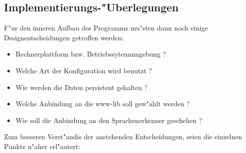 \subsection{Implementierungs-"Uberlegungen}
F"ur den inneren Aufbau des Programms mu"sten dann noch einige Designentscheidungen getroffen werden:
\begin{itemize}
	\item	Rechnerplattform bzw. Betriebssytemumgebung ?
	\item	Welche Art der Konfiguration wird benutzt ?
	\item	Wie werden die Daten persistent gehalten ?
	\item	Welche Anbindung an die www-lib soll gew"ahlt werden ?
	\item	Wie soll die Anbindung an den Sprachenerkenner geschehen ?
\end{itemize}

Zum besseren Verst"andis der anstehenden Entscheidungen, seien die einzelnen Punkte n"aher erl"autert:

